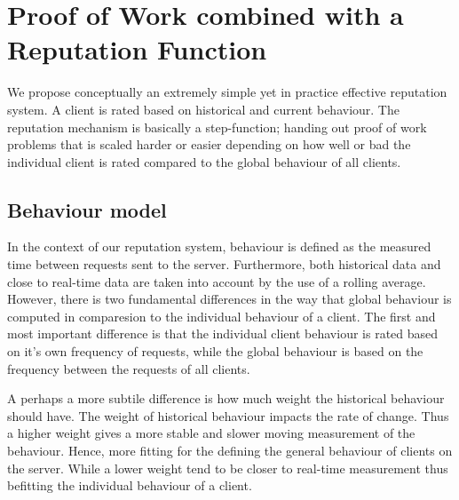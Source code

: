 \section{Proof of Work combined with a Reputation Function}
We propose conceptually an extremely simple yet in practice effective reputation system. A client is rated based on historical and current behaviour. The reputation mechanism is basically a step-function; handing out proof of work problems that is scaled harder or easier depending on how well or bad the individual client is rated compared to the global behaviour of all clients. 

\subsection{Behaviour model}
In the context of our reputation system, behaviour is defined as the measured time between requests sent to the server. Furthermore, both historical data and close to real-time data are taken into account by the use of a rolling average. However, there is two fundamental differences in the way that global behaviour is computed in comparesion to the individual behaviour of a client. The first and most important difference is that the individual client behaviour is rated based on it's own frequency of requests, while the global behaviour is based on the frequency between the requests of all clients. 

A perhaps a more subtile difference is how much weight the historical behaviour should have. The weight of historical behaviour impacts the rate of change. Thus a higher weight gives a more stable and slower moving measurement of the behaviour. Hence, more fitting for the defining the general behaviour of clients on the server. While a lower weight tend to be closer to real-time measurement thus befitting the individual behaviour of a client.